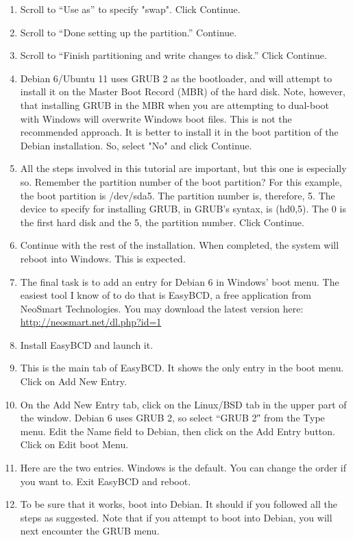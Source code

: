 \documentclass[12pt,notitlepage,onecolumn,oneside,openany,draft]{memoir}
\begin{document}
\begin{enumerate}
\item \textsf{Scroll to “Use as” to specify "swap". Click Continue.}

\item \textsf{Scroll to “Done setting up the partition.” Continue.} 

\item \textsf{Scroll to “Finish partitioning and write changes to disk.”  Click Continue.} 

\item \textsf{Debian 6/Ubuntu 11 uses GRUB 2 as the bootloader, and will attempt to install it on the Master Boot Record (MBR) of the hard disk. Note, however, that installing GRUB in the MBR when you are attempting to dual-boot with Windows will overwrite Windows boot files. This is not the recommended approach. It is better to install it in the boot partition of the Debian installation. So, select "No" and click Continue.} 

\item \textsf{All the steps involved in this tutorial are important, but this one is especially so. Remember the partition number of the boot partition? For this example, the boot partition is /dev/sda5. The partition number is, therefore, 5. The device to specify for installing GRUB, in GRUB’s syntax, is (hd0,5). The 0 is the first hard disk and the 5, the partition number. Click Continue.}

\item \textsf{Continue with the rest of the installation. When completed, the system will reboot into Windows. This is expected.}
 
\item \textsf{The final task is to add an entry for Debian 6 in Windows’ boot menu. The easiest tool I know of to do that is EasyBCD, a free application from NeoSmart Technologies. You may download the latest version here:} \newline 
      \url{http://neosmart.net/dl.php?id=1} 
      
\item \textsf{Install EasyBCD and launch it.}
 
\item \textsf{This is the main tab of EasyBCD. It shows the only entry in the boot menu. Click on Add New Entry.} 

\item \textsf{On the Add New Entry tab, click on the Linux/BSD tab in the upper part of the window. Debian 6 uses GRUB 2, so select “GRUB 2″ from the Type menu. Edit the Name field to Debian, then click on the Add Entry button. Click on Edit boot Menu.}
 
\item \textsf{Here are the two entries. Windows is the default. You can change the order if you want to. Exit EasyBCD and reboot.} 

\item \textsf{To be sure that it works, boot into Debian. It should if you followed all the steps as suggested. Note that if you attempt to boot into Debian, you will next encounter the GRUB menu.}
\end{enumerate}
\end{document}
